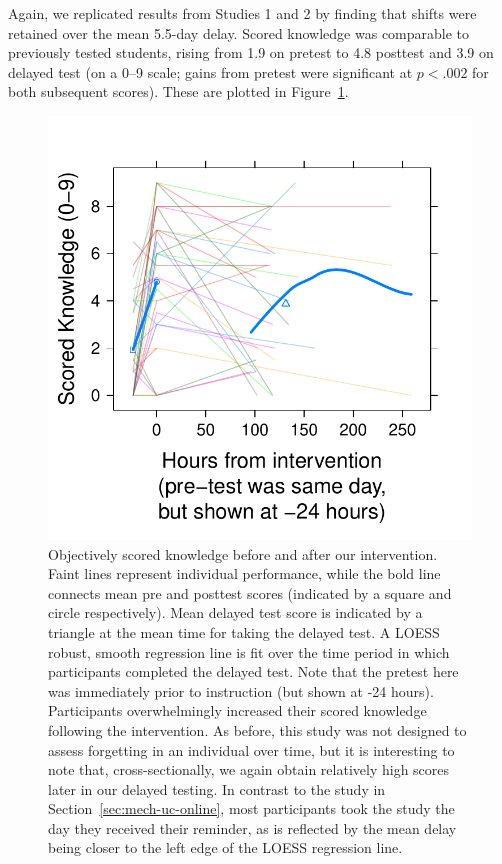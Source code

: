 Again, we replicated results from Studies 1 and 2 by finding that shifts were
retained over the mean 5.5-day delay. Scored knowledge was comparable to
previously tested students, rising from 1.9 on pretest to 4.8 posttest and 3.9
on delayed test (on a 0--9 scale; gains from pretest were significant at
$p<.002$ for both subsequent scores). These are plotted in
Figure~\ref{fig:CCO-mech-scored}. 

\begin{figure}
    \centering
    \includegraphics{CCO-mech-scored.pdf}
    \caption{Objectively scored knowledge before and after our intervention.
        Faint lines represent individual performance, while the bold line
        connects mean pre and posttest scores (indicated by a square and circle
        respectively). Mean delayed test score is indicated by a triangle at the
        mean time for taking the delayed test. A LOESS robust, smooth regression
        line is fit over the time period in which participants completed the
        delayed test.  Note that the pretest here was immediately prior to
        instruction (but shown at -24 hours). Participants overwhelmingly
        increased their scored knowledge following the intervention. As before,
        this study was not designed to assess forgetting in an individual over
        time, but it is interesting to note that, cross-sectionally, we again
        obtain relatively high scores later in our delayed testing. In contrast
        to the study in Section~\ref{sec:mech-uc-online}, most participants took
        the study the day they received their reminder, as is reflected by the
        mean delay being closer to the left edge of the LOESS regression line.}
    \label{fig:CCO-mech-scored}
\end{figure}

